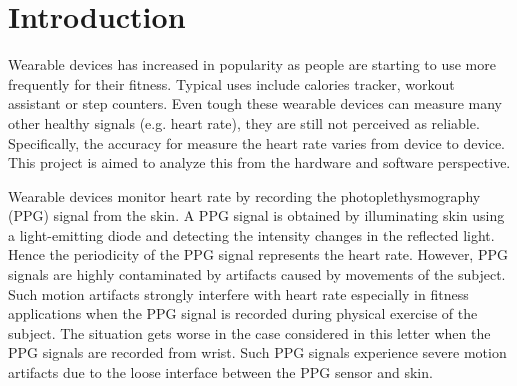 \documentclass[11pt, draftclsnofoot, onecolumn]{IEEEtran}
\begin{document}
	
	
	
	
	
	\maketitle
	
	
	
	
	
	
	\IEEEpeerreviewmaketitle
	
	\section{Introduction} \label{sec:Introduction} %
	
	
    Wearable devices has increased in popularity as people are starting to use more frequently for their fitness. Typical uses include calories tracker, workout assistant or step counters. Even tough these wearable devices can measure many other healthy signals (e.g. heart rate), they are still not perceived as reliable. Specifically, the accuracy for measure the heart rate varies from device to device. This project is aimed to analyze this from the hardware and software perspective.
    
    Wearable devices monitor heart rate by recording the photoplethysmography (PPG) signal from the skin. A PPG signal is obtained by illuminating skin using a light-emitting diode and detecting the intensity changes in the reflected light. Hence the periodicity of the PPG signal represents the heart rate. However, PPG signals are highly contaminated by artifacts caused by movements of the subject. Such motion artifacts strongly interfere with heart rate especially in fitness applications when the PPG signal is recorded during physical exercise of the subject. The situation gets worse in the case considered in this letter when the PPG signals are recorded from wrist. Such PPG signals experience severe motion artifacts due to the loose interface between the PPG sensor and skin.
    
\end{document}
